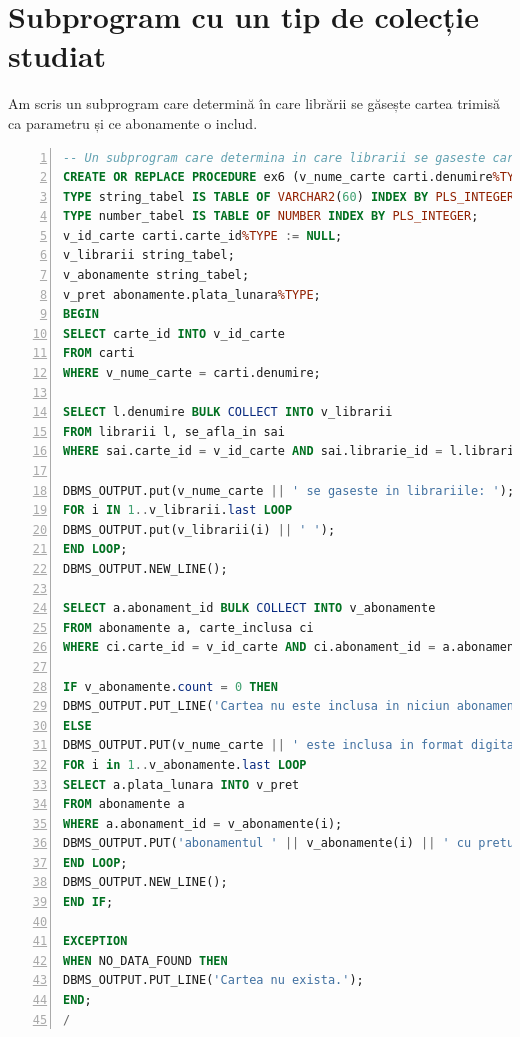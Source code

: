 \documentclass[12pt]{article}
\begin{document}
\section{Subprogram cu un tip de colecție studiat}
Am scris un subprogram care determină în care librării se găsește cartea trimisă ca parametru și ce abonamente o includ.\\
\begin{lstlisting}[language=SQL,
	showspaces=false,
	basicstyle=\ttfamily,
	numbers=left,
	numberstyle=\tiny,
	breaklines=true,
	commentstyle=\color{gray}]
-- Un subprogram care determina in care librarii se gaseste cartea introdusa ca parametru si ce abonamente o includ.
CREATE OR REPLACE PROCEDURE ex6 (v_nume_carte carti.denumire%TYPE )IS
TYPE string_tabel IS TABLE OF VARCHAR2(60) INDEX BY PLS_INTEGER;
TYPE number_tabel IS TABLE OF NUMBER INDEX BY PLS_INTEGER;
v_id_carte carti.carte_id%TYPE := NULL;
v_librarii string_tabel;
v_abonamente string_tabel;
v_pret abonamente.plata_lunara%TYPE;
BEGIN
SELECT carte_id INTO v_id_carte
FROM carti
WHERE v_nume_carte = carti.denumire;

SELECT l.denumire BULK COLLECT INTO v_librarii
FROM librarii l, se_afla_in sai
WHERE sai.carte_id = v_id_carte AND sai.librarie_id = l.librarie_id;

DBMS_OUTPUT.put(v_nume_carte || ' se gaseste in librariile: ');
FOR i IN 1..v_librarii.last LOOP
DBMS_OUTPUT.put(v_librarii(i) || ' ');
END LOOP;
DBMS_OUTPUT.NEW_LINE();

SELECT a.abonament_id BULK COLLECT INTO v_abonamente
FROM abonamente a, carte_inclusa ci
WHERE ci.carte_id = v_id_carte AND ci.abonament_id = a.abonament_id;

IF v_abonamente.count = 0 THEN
DBMS_OUTPUT.PUT_LINE('Cartea nu este inclusa in niciun abonament.');
ELSE
DBMS_OUTPUT.PUT(v_nume_carte || ' este inclusa in format digital in abonamentele: ');
FOR i in 1..v_abonamente.last LOOP
SELECT a.plata_lunara INTO v_pret
FROM abonamente a
WHERE a.abonament_id = v_abonamente(i);
DBMS_OUTPUT.PUT('abonamentul ' || v_abonamente(i) || ' cu pretul ' || v_pret || ', ');
END LOOP;
DBMS_OUTPUT.NEW_LINE();
END IF;

EXCEPTION 
WHEN NO_DATA_FOUND THEN
DBMS_OUTPUT.PUT_LINE('Cartea nu exista.');
END;
/
\end{lstlisting}
\end{document}
